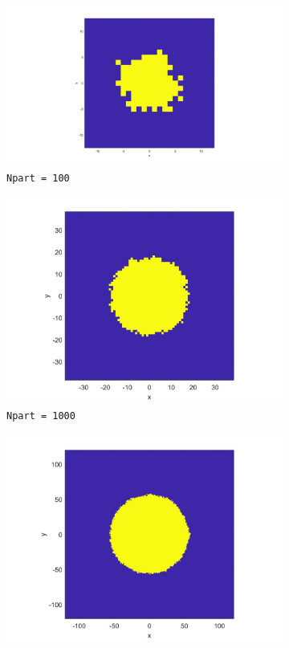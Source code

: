 \documentclass[letterpaper]{article}
\numberwithin{equation}{section} %
\numberwithin{figure}{section} %
\numberwithin{table}{section} %
\begin{document}
\begin{figure}[htbp]
	\centering
	\begin{subfigure}[b]{0.3\textwidth}
		\includegraphics[width=\textwidth]{8direct_Npart100_3suW11T}
		\caption{\texttt{Npart = 100}}
		\label{8direct_Npart100_3suW11T}
	\end{subfigure}
	\begin{subfigure}[b]{0.3\textwidth}
		\includegraphics[width=\textwidth]{8direct_Npart1000_3suW11T}
		\caption{\texttt{Npart = 1000}}
		\label{8direct_Npart1000_3suW11T}
	\end{subfigure}
	\begin{subfigure}[b]{0.3\textwidth}
		\includegraphics[width=\textwidth]{8direct_Npart10000_3suW11T}

\end{subfigure}
\end{figure}
\end{document}
